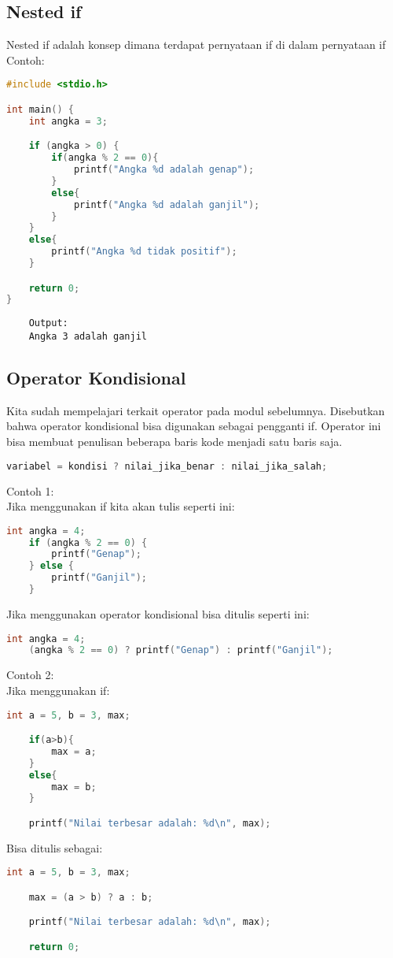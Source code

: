 \subsection{Nested if}

Nested if adalah konsep dimana terdapat pernyataan if di dalam pernyataan if
\\ Contoh:
\begin{lstlisting}[language=c]
#include <stdio.h>

int main() {
	int angka = 3;

	if (angka > 0) {
		if(angka % 2 == 0){
			printf("Angka %d adalah genap");
		}
		else{
			printf("Angka %d adalah ganjil");
		}
	}
	else{
		printf("Angka %d tidak positif");
	}

	return 0;
}
\end{lstlisting}
\begin{verbatim}
	Output:
	Angka 3 adalah ganjil
\end{verbatim}

\subsection{Operator Kondisional}
Kita sudah mempelajari terkait operator pada modul sebelumnya.
Disebutkan bahwa operator kondisional bisa digunakan sebagai pengganti if.
Operator ini bisa membuat penulisan beberapa baris kode menjadi satu baris saja.
{
\captionsetup[lstlisting]{labelformat=empty, justification=raggedright, singlelinecheck=false} %
\begin{lstlisting}[language=c, caption={syntax}]
	variabel = kondisi ? nilai_jika_benar : nilai_jika_salah;
\end{lstlisting}
}
Contoh 1:
\\ Jika menggunakan if kita akan tulis seperti ini:
\begin{lstlisting}[language=c]
	int angka = 4;
	if (angka % 2 == 0) {
		printf("Genap");
	} else {
		printf("Ganjil");
	}
\end{lstlisting}
Jika menggunakan operator kondisional bisa ditulis seperti ini:
\begin{lstlisting}[language=c]
	int angka = 4;
    (angka % 2 == 0) ? printf("Genap") : printf("Ganjil");
\end{lstlisting}

Contoh 2:
\\ Jika menggunakan if:
\begin{lstlisting}[language=c]
	int a = 5, b = 3, max;

	if(a>b){
		max = a;
	}
	else{
		max = b;
	}

	printf("Nilai terbesar adalah: %d\n", max);
\end{lstlisting}
Bisa ditulis sebagai:
\begin{lstlisting}[language=c]
	int a = 5, b = 3, max;

	max = (a > b) ? a : b;

	printf("Nilai terbesar adalah: %d\n", max);

	return 0;
\end{lstlisting}

